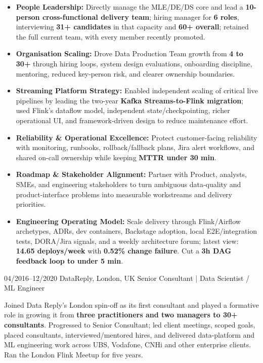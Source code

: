 \documentclass[]{../../../../friggeri-cv}
\begin{document}
\begin{entrylist}
{{        }
        \begin{itemize}[leftmargin=1.1em]
                                                \item \footnotesize\textbf{People Leadership:} Directly manage the MLE/DE/DS core and lead a \textbf{10-person cross-functional delivery team}; hiring manager for \textbf{6 roles}, interviewing \textbf{31+ candidates} in that capacity and \textbf{60+ overall}; retained the full current team, with every member recently promoted.
                                                \item \footnotesize\textbf{Organisation Scaling:} Drove Data Production Team growth from \textbf{4 to 30+} through hiring loops, system design evaluations, onboarding discipline, mentoring, reduced key-person risk, and clearer ownership boundaries.
                                                \item \footnotesize\textbf{Streaming Platform Strategy:} Enabled independent scaling of critical live pipelines by leading the two-year \textbf{Kafka Streams-to-Flink migration}; used Flink's dataflow model, independent state/checkpointing, richer operational UI, and framework-driven design to reduce maintenance effort.
                                                \item \footnotesize\textbf{Reliability \& Operational Excellence:} Protect customer-facing reliability with monitoring, runbooks, rollback/fallback plans, Jira alert workflows, and shared on-call ownership while keeping \textbf{MTTR under 30 min}.
                                                \item \footnotesize\textbf{Roadmap \& Stakeholder Alignment:} Partner with Product, analysts, SMEs, and engineering stakeholders to turn ambiguous data-quality and product-interface problems into measurable workstreams and delivery priorities.
                                                \item \footnotesize\textbf{Engineering Operating Model:} Scale delivery through Flink/Airflow archetypes, ADRs, dev containers, Backstage adoption, local E2E/integration tests, DORA/Jira signals, and a weekly architecture forum; latest view: \textbf{14.65 deploys/week} with \textbf{0.52\% change failure}. Cut a \textbf{3h DAG feedback loop to under 5 min}.
        \end{itemize}
    }
    \entry
    {04/2016--12/2020}
    {DataReply, London, UK}
    {Senior Consultant | Data Scientist / ML Engineer}
    {
        {\small
        \setlength{\parindent}{0pt}
        \setlength{\leftskip}{0pt}
                            Joined Data Reply's London spin-off as its first consultant and played a formative role in growing it from \textbf{three practitioners and two managers to 30+ consultants}. Progressed to Senior Consultant; led client meetings, scoped goals, placed consultants, interviewed/mentored hires, and delivered data-platform and ML engineering work across UBS, Vodafone, CNHi and other enterprise clients. Ran the London Flink Meetup for five years.

}}
\end{entrylist}
\end{document}
